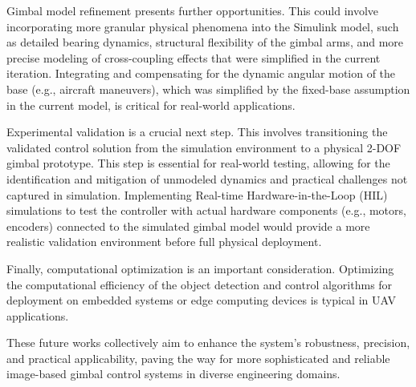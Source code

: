 Gimbal model refinement presents further opportunities. This could involve incorporating more granular physical phenomena into the Simulink model, such as detailed bearing dynamics, structural flexibility of the gimbal arms, and more precise modeling of cross-coupling effects that were simplified in the current iteration. Integrating and compensating for the dynamic angular motion of the base (e.g., aircraft maneuvers), which was simplified by the fixed-base assumption in the current model, is critical for real-world applications.

Experimental validation is a crucial next step. This involves transitioning the validated control solution from the simulation environment to a physical 2-DOF gimbal prototype. This step is essential for real-world testing, allowing for the identification and mitigation of unmodeled dynamics and practical challenges not captured in simulation. Implementing Real-time Hardware-in-the-Loop (HIL) simulations to test the controller with actual hardware components (e.g., motors, encoders) connected to the simulated gimbal model would provide a more realistic validation environment before full physical deployment.

Finally, computational optimization is an important consideration. Optimizing the computational efficiency of the object detection and control algorithms for deployment on embedded systems or edge computing devices is typical in UAV applications.

These future works collectively aim to enhance the system's robustness, precision, and practical applicability, paving the way for more sophisticated and reliable image-based gimbal control systems in diverse engineering domains.